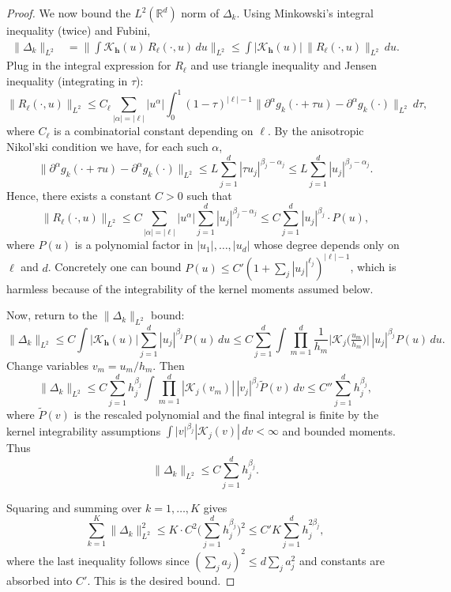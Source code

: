 \documentclass[10pt,a4paper]{amsart}
\newcommand{\mcal}{\mathcal}
\begin{document}
\begin{proof}
We now bound the $L^2(\mathbb{R}^d)$ norm of $\Delta_k$. Using Minkowski's integral inequality (twice) and Fubini,
\begin{align*}
\|\Delta_k\|_{L^2} 
&= \Big\| \int \mcal{K}_{\mathbf{h}}(u)\, R_\ell(\cdot,u)\,du \Big\|_{L^2}
\le \int |\mcal{K}_{\mathbf{h}}(u)|\, \|R_\ell(\cdot,u)\|_{L^2}\,du.
\end{align*}
Plug in the integral expression for $R_\ell$ and use triangle inequality and Jensen inequality (integrating in $\tau$):
\[
\|R_\ell(\cdot,u)\|_{L^2}
\le C_\ell \sum_{|\alpha|=|\ell|} |u^\alpha| \int_0^1 (1-\tau)^{|\ell|-1}
\|\partial^\alpha g_k(\cdot+\tau u)-\partial^\alpha g_k(\cdot)\|_{L^2}\,d\tau,
\]
where \(C_\ell\) is a combinatorial constant depending on \(\ell\). By the anisotropic Nikol'ski condition we have, for each such \(\alpha\),
\[
\|\partial^\alpha g_k(\cdot+\tau u)-\partial^\alpha g_k(\cdot)\|_{L^2}
\le L \sum_{j=1}^d |\tau u_j|^{\beta_j-\alpha_j}
\le L \sum_{j=1}^d |u_j|^{\beta_j-\alpha_j}.
\]
Hence, there exists a constant $C>0$ such that
\[
\|R_\ell(\cdot,u)\|_{L^2}
\le C \sum_{|\alpha|=|\ell|} |u^\alpha|\sum_{j=1}^d |u_j|^{\beta_j-\alpha_j}
\le C \sum_{j=1}^d |u_j|^{\beta_j} \cdot P(u),
\]
where \(P(u)\) is a polynomial factor in \(|u_1|,\dots,|u_d|\) whose degree depends only on \(\ell\) and \(d\). Concretely one can bound \(P(u)\le C'(1+\sum_{j}|u_j|^{\ell_j})^{|\ell|-1}\), which is harmless because of the integrability of the kernel moments assumed below.

Now, return to the $\|\Delta_k\|_{L^2}$ bound:
\[
\|\Delta_k\|_{L^2}
\le C \int |\mcal{K}_{\mathbf{h}}(u)| \sum_{j=1}^d |u_j|^{\beta_j} P(u)\,du
\le C \sum_{j=1}^d \int \prod_{m=1}^d \frac{1}{h_m}\big|\mcal{K}_j\big(\tfrac{u_m}{h_m}\big)\big|
\, |u_j|^{\beta_j} P(u)\,du.
\]
Change variables $v_m=u_m/h_m$. Then
\[
\|\Delta_k\|_{L^2}
\le C \sum_{j=1}^d h_j^{\beta_j} \int \prod_{m=1}^d |\mcal{K}_j(v_m)|\, |v_j|^{\beta_j} \tilde P(v)\,dv
\le C''\sum_{j=1}^d h_j^{\beta_j},
\]
where $\tilde P(v)$ is the rescaled polynomial and the final integral is finite by the kernel integrability assumptions $\int |v|^{\beta_j}|\mcal{K}_j(v)|\,dv<\infty$ and bounded moments. Thus
\[
\|\Delta_k\|_{L^2} \le C\sum_{j=1}^d h_j^{\beta_j}.
\]

Squaring and summing over $k=1,\dots,K$ gives
\[
\sum_{k=1}^K \|\Delta_k\|_{L^2}^2
\le K \cdot C^2 \Big(\sum_{j=1}^d h_j^{\beta_j}\Big)^2
\le C' K \sum_{j=1}^d h_j^{2\beta_j},
\]
where the last inequality follows since $(\sum_j a_j)^2 \le d\sum_j a_j^2$ and constants are absorbed into \(C'\). This is the desired bound.
\end{proof}
\end{document}
